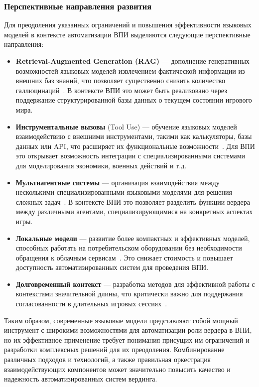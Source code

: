 \subsubsection{Перспективные направления развития}

Для преодоления указанных ограничений и повышения эффективности языковых моделей в контексте автоматизации ВПИ выделяются следующие перспективные направления:

\begin{itemize}
    \item \textbf{Retrieval-Augmented Generation (RAG)} — дополнение генеративных возможностей языковых моделей извлечением фактической информации из внешних баз знаний, что позволяет существенно снизить количество галлюцинаций~\cite{lewis2020retrieval}. В контексте ВПИ это может быть реализовано через поддержание структурированной базы данных о текущем состоянии игрового мира.

    \item \textbf{Инструментальные вызовы} (Tool Use) — обучение языковых моделей взаимодействию с внешними инструментами, такими как калькуляторы, базы данных или API, что расширяет их функциональные возможности~\cite{schick2023toolformer}. Для ВПИ это открывает возможность интеграции с специализированными системами для моделирования экономики, военных действий и т.д.

    \item \textbf{Мультиагентные системы} — организация взаимодействия между несколькими специализированными языковыми моделями для решения сложных задач~\cite{park2023generative}. В контексте ВПИ это позволяет разделить функции вердера между различными агентами, специализирующимися на конкретных аспектах игры.

    \item \textbf{Локальные модели} — развитие более компактных и эффективных моделей, способных работать на потребительском оборудовании без необходимости обращения к облачным сервисам~\cite{liu2023llama}. Это снижает стоимость и повышает доступность автоматизированных систем для проведения ВПИ.

    \item \textbf{Долговременный контекст} — разработка методов для эффективной работы с контекстами значительной длины, что критически важно для поддержания согласованности в длительных игровых сессиях~\cite{peng2023yarn}.
\end{itemize}

Таким образом, современные языковые модели представляют собой мощный инструмент с широкими возможностями для автоматизации роли вердера в ВПИ, но их эффективное применение требует понимания присущих им ограничений и разработки комплексных решений для их преодоления. Комбинирование различных подходов и технологий, а также правильная оркестрация взаимодействующих компонентов может значительно повысить качество и надежность автоматизированных систем вердинга.

